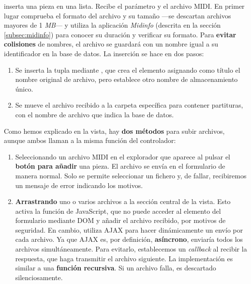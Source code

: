  inserta una pieza en una lista. Recibe el parámetro  y el archivo \acrshort{MIDI}. En primer lugar comprueba el formato del archivo y su tamaño ---se descartan archivos mayores de 1 \textit{MB}--- y utiliza la aplicación \textit{Midinfo} (descrita en la sección \ref{subsec:midinfo}) para conocer su duración y verificar su formato. Para \textbf{evitar colisiones} de nombres, el archivo se guardará con un nombre igual a su identificador en la base de datos. La inserción se hace en dos pasos:

\begin{enumerate}
	\item Se inserta la tupla mediante , que crea el elemento asignando como título el nombre original de archivo, pero establece otro nombre de almacenamiento único.
	
	\item Se mueve el archivo recibido a la carpeta específica para contener partituras, con el nombre de archivo que indica la base de datos.
\end{enumerate}

Como hemos explicado en la vista, hay \textbf{dos métodos} para subir archivos, aunque ambos llaman a la misma función del controlador:

\begin{enumerate}
	\item Seleccionando un archivo \acrshort{MIDI} en el explorador que aparece al pulsar el\textbf{ botón para añadir} una pieza. El archivo se envía en el formulario de manera normal. Solo se permite seleccionar un fichero y, de fallar, recibiremos un mensaje de error indicando los motivos.
	
	\item \textbf{Arrastrando} uno o varios archivos a la sección central de la vista. Esto activa la función  de JavaScript, que no puede acceder al elemento  del formulario mediante \acrshort{DOM} y añadir el archivo recibido, por motivos de seguridad. En cambio, utiliza \acrshort{AJAX} para hacer dinámicamente un envío por cada archivo. Ya que \acrshort{AJAX} es, por definición, \textbf{asíncrono}, enviaría todos los archivos simultáneamente. Para evitarlo, establecemos un \textit{callback} al recibir la respuesta, que haga transmitir el archivo siguiente. La implementación es similar a una \textbf{función recursiva}. Si un archivo falla, es descartado silenciosamente.
\end{enumerate}


